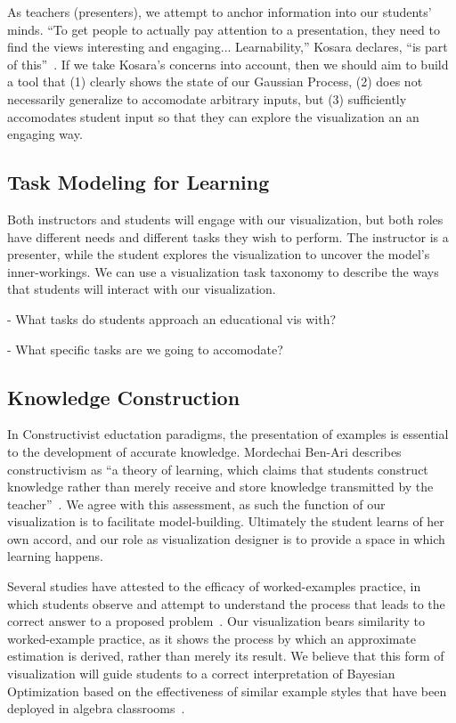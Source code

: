 \documentclass{vgtc}                          %
\begin{document}
As teachers (presenters), we attempt to anchor information into our students'
minds. ``To get people to actually pay attention to a presentation, they need
to find the views interesting and engaging... Learnability,'' Kosara declares,
``is part of this''~\cite{Kosara}. If we take Kosara's concerns into account,
then we should aim to build a tool that (1) clearly shows the state of our
Gaussian Process, (2) does not necessarily generalize to accomodate arbitrary
inputs, but (3) sufficiently accomodates student input so that they can explore
the visualization an an engaging way.

\subsection{Task Modeling for Learning}

Both instructors and students will engage with our visualization, but both
roles have different needs and different tasks they wish to perform. The
instructor is a presenter, while the student explores the visualization to
uncover the model's inner-workings. We can use a visualization task taxonomy to
describe the ways that students will interact with our visualization.

- What tasks do students approach an educational vis with?

- What specific tasks are we going to accomodate?

\subsection{Knowledge Construction}

In Constructivist eductation paradigms, the presentation of examples is
essential to the development of accurate knowledge. Mordechai Ben-Ari describes
constructivism as ``a theory of learning, which claims that students construct
knowledge rather than merely receive and store knowledge transmitted by the
teacher''~\cite{benari}. We agree with this assessment, as such the function
of our visualization is to facilitate model-building. Ultimately the student learns
of her own accord, and our role as visualization designer is to provide a space in
which learning happens.

Several studies have attested to the efficacy of worked-examples practice, in
which students observe and attempt to understand the process that leads to the
correct answer to a proposed problem~\cite{kirschner}. Our visualization bears
similarity to worked-example practice, as it shows the process by which an
approximate estimation is derived, rather than merely its result. We believe
that this form of visualization will guide students to a correct interpretation
of Bayesian Optimization based on the effectiveness of similar example styles
that have been deployed in algebra classrooms~\cite{workex}.
\end{document}
